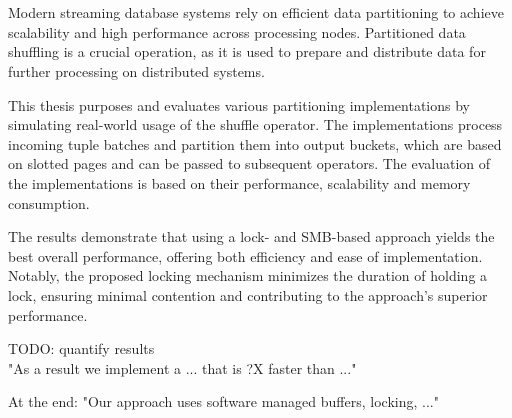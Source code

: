 \chapter{\abstractname}

Modern streaming database systems rely on efficient data partitioning to achieve scalability and high performance across processing nodes. Partitioned data shuffling is a crucial operation, as it is used to prepare and distribute data for further processing on distributed systems.

This thesis purposes and evaluates various partitioning implementations by simulating real-world usage of the shuffle operator. The implementations process incoming tuple batches and partition them into output buckets, which are based on slotted pages and can be passed to subsequent operators. The evaluation of the implementations is based on their performance, scalability and memory consumption.

The results demonstrate that using a lock- and \ac{SMB}-based approach yields the best overall performance, offering both efficiency and ease of implementation. Notably, the proposed locking mechanism minimizes the duration of holding a lock, ensuring minimal contention and contributing to the approach's superior performance.

{\color{red}TODO: quantify results \\ "As a result we implement a ... that is ?X faster than ..."

At the end: "Our approach uses software managed buffers, locking, ..." }
